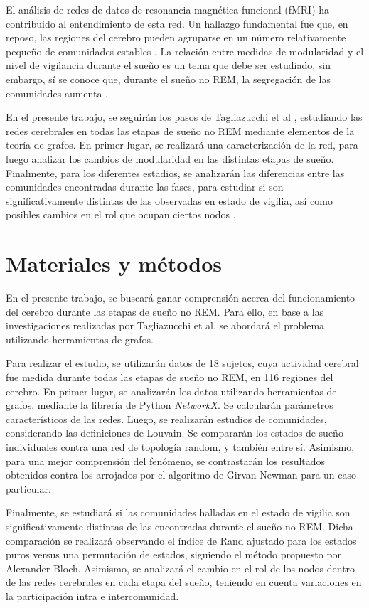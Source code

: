 \documentclass[a4paper,10pt,twocolumn,spanish]{article}
\begin{document}
El análisis de redes de datos de resonancia magnética funcional (fMRI) ha contribuido al entendimiento de esta red. Un hallazgo fundamental fue que, en reposo, las regiones del cerebro pueden agruparse en un número relativamente pequeño de comunidades estables \cite{ref2}. La relación entre medidas de modularidad y el nivel de vigilancia durante el sueño es un tema que debe ser estudiado, sin embargo, sí se conoce que, durante el sueño no REM, la segregación de las comunidades aumenta \cite{ref3}.

En el presente trabajo, se seguirán los pasos de Tagliazucchi et al \cite{ref3}, estudiando las redes cerebrales en todas las etapas de sueño no REM mediante elementos de la teoría de grafos. En primer lugar, se realizará una caracterización de la red, para luego analizar los cambios de modularidad en las distintas etapas de sueño. Finalmente, para los diferentes estadios, se analizarán las diferencias entre las comunidades encontradas durante las fases, para estudiar si son significativamente distintas de las observadas en estado de vigilia, así como posibles cambios en el rol que ocupan ciertos nodos \cite{ref4}.

\section{Materiales y métodos}

En el presente trabajo, se buscará ganar comprensión acerca del funcionamiento del cerebro durante las etapas de sueño no REM. Para ello, en base a las investigaciones realizadas por Tagliazucchi et al, se abordará el problema utilizando herramientas de grafos. 

Para realizar el estudio, se utilizarán datos de 18 sujetos, cuya actividad cerebral fue medida durante todas las etapas de sueño no REM, en 116 regiones del cerebro. En primer lugar, se analizarán los datos utilizando herramientas de grafos, mediante la librería de Python \textit{NetworkX}. Se calcularán parámetros característicos de las redes. Luego, se realizarán estudios de comunidades, considerando las definiciones de Louvain. Se compararán los estados de sueño individuales contra una red de topología random, y también entre sí. Asimismo, para una mejor comprensión del fenómeno, se contrastarán los resultados obtenidos contra los arrojados por el algoritmo de Girvan-Newman para un caso particular.

Finalmente, se estudiará si las comunidades halladas en el estado de vigilia son significativamente distintas de las encontradas durante el sueño no REM. Dicha comparación se realizará observando el índice de Rand ajustado para los estados puros versus una permutación de estados, siguiendo el método propuesto por Alexander-Bloch. Asimismo, se analizará el cambio en el rol de los nodos dentro de las redes cerebrales en cada etapa del sueño, teniendo en cuenta variaciones en la participación intra e intercomunidad.
\end{document}
